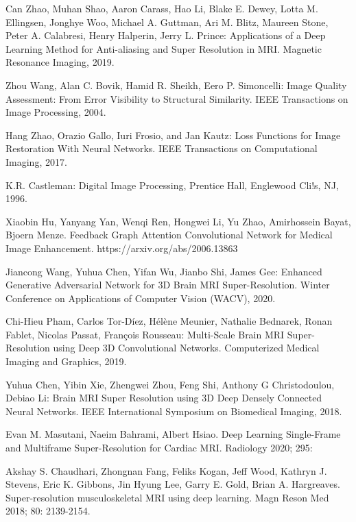 \documentclass[runningheads]{llncs}
\begin{document}
\begin{thebibliography}{8}
Can Zhao, Muhan Shao, Aaron Carass, Hao Li, Blake E. Dewey, Lotta M. Ellingsen, Jonghye Woo, Michael A. Guttman, Ari M. Blitz, Maureen Stone, Peter A. Calabresi, Henry Halperin, Jerry L. Prince: Applications of a Deep Learning Method for Anti-aliasing and Super Resolution in MRI. Magnetic Resonance Imaging, 2019.

Zhou Wang, Alan C. Bovik, Hamid R. Sheikh, Eero P. Simoncelli: Image Quality Assessment: From Error Visibility to Structural Similarity. IEEE Transactions on Image Processing, 2004.

Hang Zhao, Orazio Gallo, Iuri Frosio, and Jan Kautz: Loss Functions for Image Restoration With Neural Networks.  IEEE Transactions on Computational Imaging, 2017.

K.R. Castleman: Digital Image Processing, Prentice Hall, Englewood Cli!s, NJ, 1996.

Xiaobin Hu, Yanyang Yan, Wenqi Ren, Hongwei Li, Yu Zhao, Amirhossein Bayat, Bjoern Menze. Feedback Graph Attention Convolutional Network for Medical Image Enhancement. https://arxiv.org/abs/2006.13863

Jiancong Wang, Yuhua Chen, Yifan Wu, Jianbo Shi, James Gee: Enhanced Generative Adversarial Network for 3D Brain MRI Super-Resolution. Winter Conference on Applications of Computer Vision (WACV), 2020.

Chi-Hieu Pham, Carlos Tor-Díez, Hélène Meunier, Nathalie Bednarek, Ronan Fablet, Nicolas Passat, François Rousseau: Multi-Scale Brain MRI Super-Resolution using Deep 3D Convolutional Networks. Computerized Medical Imaging and Graphics, 2019.

Yuhua Chen, Yibin Xie, Zhengwei Zhou, Feng Shi, Anthony G Christodoulou, Debiao Li: Brain MRI Super Resolution using 3D Deep Densely Connected Neural Networks. IEEE International Symposium on Biomedical Imaging, 2018.

Evan M. Masutani, Naeim Bahrami, Albert Hsiao. Deep Learning Single-Frame and Multiframe Super-Resolution for Cardiac MRI. Radiology 2020; 295: 

Akshay S. Chaudhari, Zhongnan Fang, Feliks Kogan, Jeff Wood, Kathryn J. Stevens, Eric K. Gibbons, Jin Hyung Lee, Garry E. Gold, Brian A. Hargreaves. Super-resolution musculoskeletal MRI using deep learning. Magn Reson Med 2018; 80: 2139-2154.


\end{thebibliography}
\end{document}
